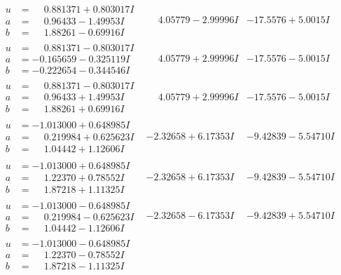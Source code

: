 \documentclass[1p]{elsarticle_modified}
\theoremstyle{definition}
\begin{document}
$$\begin{array}{c|c|c}
\begin{aligned}
u &= \phantom{-}0.881371 + 0.803017 I \\
a &= \phantom{-}0.96433 - 1.49953 I \\
b &= \phantom{-}1.88261 - 0.69916 I\end{aligned}
 & \phantom{-}4.05779 - 2.99996 I & -17.5576 + 5.0015 I \\ \hline\begin{aligned}
u &= \phantom{-}0.881371 - 0.803017 I \\
a &= -0.165659 - 0.325119 I \\
b &= -0.222654 - 0.344546 I\end{aligned}
 & \phantom{-}4.05779 + 2.99996 I & -17.5576 - 5.0015 I \\ \hline\begin{aligned}
u &= \phantom{-}0.881371 - 0.803017 I \\
a &= \phantom{-}0.96433 + 1.49953 I \\
b &= \phantom{-}1.88261 + 0.69916 I\end{aligned}
 & \phantom{-}4.05779 + 2.99996 I & -17.5576 - 5.0015 I \\ \hline\begin{aligned}
u &= -1.013000 + 0.648985 I \\
a &= \phantom{-}0.219984 + 0.625623 I \\
b &= \phantom{-}1.04442 + 1.12606 I\end{aligned}
 & -2.32658 + 6.17353 I & -9.42839 - 5.54710 I \\ \hline\begin{aligned}
u &= -1.013000 + 0.648985 I \\
a &= \phantom{-}1.22370 + 0.78552 I \\
b &= \phantom{-}1.87218 + 1.11325 I\end{aligned}
 & -2.32658 + 6.17353 I & -9.42839 - 5.54710 I \\ \hline\begin{aligned}
u &= -1.013000 - 0.648985 I \\
a &= \phantom{-}0.219984 - 0.625623 I \\
b &= \phantom{-}1.04442 - 1.12606 I\end{aligned}
 & -2.32658 - 6.17353 I & -9.42839 + 5.54710 I \\ \hline\begin{aligned}
u &= -1.013000 - 0.648985 I \\
a &= \phantom{-}1.22370 - 0.78552 I \\
b &= \phantom{-}1.87218 - 1.11325 I\end{aligned}

\end{array}$$
\end{document}
